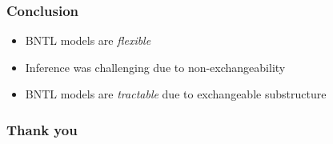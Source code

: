 \documentclass[final,hyperref={pdfpagelabels=false},noamsthm]{beamer}
\begin{document}
\begin{frame}
	\frametitle{Conclusion}
	\begin{itemize}
		\item BNTL models are \textit{flexible}
		\item Inference was challenging due to non-exchangeability
		\pause 
		\item BNTL models are \textit{tractable} due to exchangeable substructure
	\end{itemize}
\end{frame}

\begin{frame}
	\frametitle{Thank you}
	\begin{center}

\end{center}
\end{frame}
\end{document}
